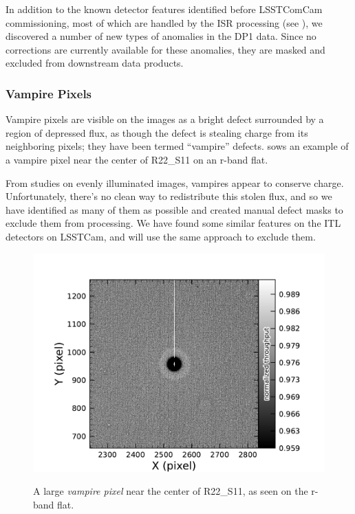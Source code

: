 In addition to the known detector features identified before LSSTComCam commissioning, most of which are handled by the ISR processing (see ), we discovered a number of new types of anomalies in the DP1 data. 
Since no corrections are currently available for these anomalies, they are masked and excluded from downstream data products.

\subsubsection{Vampire Pixels}
Vampire pixels are visible on the images as a bright defect surrounded by a region of depressed flux, as though the defect is stealing charge from its neighboring pixels; they have been termed ``vampire'' defects.
   sows an example of a vampire pixel near the center of R22\_S11 on an r-band flat.

From studies on evenly illuminated images, vampires appear to conserve charge.
Unfortunately, there's no clean way to redistribute this stolen flux, and so we have identified as many of them as possible and created manual defect masks to exclude them from processing.
We have found some similar features on the ITL detectors on LSSTCam, and will use the same approach to exclude them.
\begin{figure}[htb!]
  \centering
  \includegraphics[width=0.98\linewidth]{figures/dp1_isr_anomalies-vampire_pixel.pdf}
  \label{fig:anomalies_vampire_pixels}
  \caption{
    A large \textit{vampire pixel} near the center of R22\_S11, as seen on the r-band flat.
  }
\end{figure}

